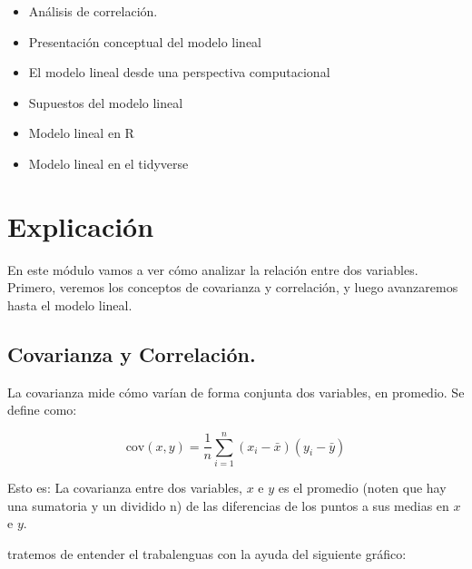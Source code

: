 \documentclass[]{book}
\newenvironment{Shaded}{\begin{snugshade}}{\end{snugshade}}
\newcommand{\DataTypeTok}[1]{\textcolor[rgb]{0.13,0.29,0.53}{#1}}
\newcommand{\KeywordTok}[1]{\textcolor[rgb]{0.13,0.29,0.53}{\textbf{#1}}}
\newcommand{\NormalTok}[1]{#1}
\newcommand{\OperatorTok}[1]{\textcolor[rgb]{0.81,0.36,0.00}{\textbf{#1}}}
\newcommand{\OtherTok}[1]{\textcolor[rgb]{0.56,0.35,0.01}{#1}}
\providecommand{\tightlist}{%
  \setlength{\itemsep}{0pt}\setlength{\parskip}{0pt}}
\begin{document}
\begin{itemize}
\tightlist
\item
  Análisis de correlación.
\item
  Presentación conceptual del modelo lineal
\item
  El modelo lineal desde una perspectiva computacional
\item
  Supuestos del modelo lineal
\item
  Modelo lineal en R
\item
  Modelo lineal en el tidyverse
\end{itemize}

\hypertarget{explicacion-7}{%
\section{Explicación}\label{explicacion-7}}

En este módulo vamos a ver cómo analizar la relación entre dos variables. Primero, veremos los conceptos de covarianza y correlación, y luego avanzaremos hasta el modelo lineal.

\begin{Shaded}
\end{Shaded}

\hypertarget{covarianza-y-correlacion.}{%
\subsection{Covarianza y Correlación.}\label{covarianza-y-correlacion.}}

La covarianza mide cómo varían de forma conjunta dos variables, en promedio. Se define como:

\[
\text{cov}(x,y)=\frac{1}{n}\sum_{i=1}^n(x_i-\bar x)(y_i-\bar y)
\]

Esto es: La covarianza entre dos variables, \(x\) e \(y\) es el promedio (noten que hay una sumatoria y un dividido n) de las diferencias de los puntos a sus medias en \(x\) e \(y\).

tratemos de entender el trabalenguas con la ayuda del siguiente gráfico:
\end{document}

